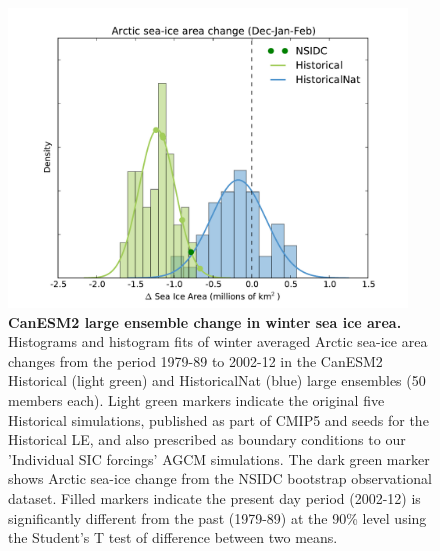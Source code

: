 \documentclass{nature}
\begin{document}
\begin{figure}%
\centering
\noindent\includegraphics[width=25pc]{Figure2.pdf}
\caption{\textbf{CanESM2 large ensemble change in winter sea ice area.} Histograms and histogram fits of winter averaged Arctic sea-ice area changes from the period 1979-89 to 2002-12 in the CanESM2 Historical (light green) and HistoricalNat (blue) large ensembles (50 members each). Light green markers indicate the original five Historical simulations, published as part of CMIP5 and seeds for the Historical LE, and also prescribed as boundary conditions to our ’Individual SIC forcings’ AGCM simulations. The dark green marker shows Arctic sea-ice change from the NSIDC bootstrap observational dataset. Filled markers indicate the present day period (2002-12) is significantly different from the past (1979-89) at the 90\% level using the Student’s T test of difference between two means. 
}
\label{fig:fig2} 
\end{figure}
\end{document}
